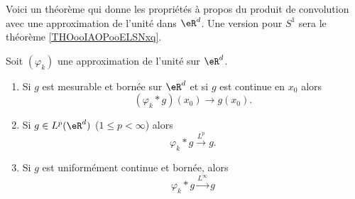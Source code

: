 Voici un théorème qui donne les propriétés à propos du produit de convolution avec une approximation de l'unité dans \( \eR^d\). Une version pour \( S^1\) sera le théorème \ref{THOooIAOPooELSNxq}.
\begin{theorem} \label{ThoYQbqEez}
    Soit \( (\varphi_k)\) une approximation de l'unité sur \( \eR^d\).
    \begin{enumerate}
        \item
            Si \( g\) est mesurable et bornée sur \( \eR^d\) et si \( g\) est continue en \( x_0\) alors
            \begin{equation}
                (\varphi_k*g)(x_0)\to g(x_0).
            \end{equation}
        \item
            Si \( g\in L^p(\eR^d)\) (\( 1\leq p<\infty\)) alors
            \begin{equation}
                \varphi_k*g\stackrel{L^p}{\to}g.
            \end{equation}
        \item
            Si \( g\) est uniformément continue et bornée, alors
            \begin{equation}
                \varphi_k*g\stackrel{L^{\infty}}{\to}g
            \end{equation}
    \end{enumerate}
\end{theorem}

